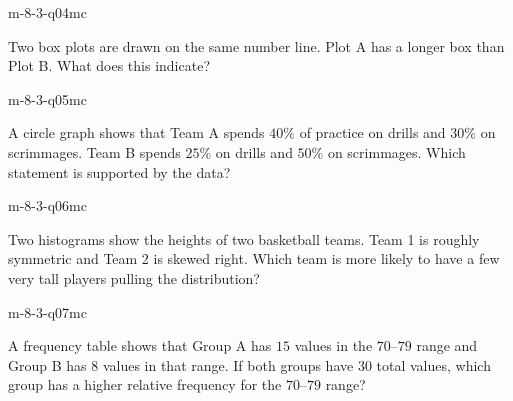 \begin{practiceQuestion}{m-8-3-q04}{mc}
\begin{questionText}
Two box plots are drawn on the same number line. Plot A has a longer box than Plot B. What does this indicate?
\end{questionText}
\end{practiceQuestion}

\begin{practiceQuestion}{m-8-3-q05}{mc}
\begin{questionText}
A circle graph shows that Team A spends $40\%$ of practice on drills and $30\%$ on scrimmages. Team B spends $25\%$ on drills and $50\%$ on scrimmages. Which statement is supported by the data?
\end{questionText}
\end{practiceQuestion}

\begin{practiceQuestion}{m-8-3-q06}{mc}
\begin{questionText}
Two histograms show the heights of two basketball teams. Team 1 is roughly symmetric and Team 2 is skewed right. Which team is more likely to have a few very tall players pulling the distribution?
\end{questionText}
\end{practiceQuestion}

\begin{practiceQuestion}{m-8-3-q07}{mc}
\begin{questionText}
A frequency table shows that Group A has $15$ values in the $70$--$79$ range and Group B has $8$ values in that range. If both groups have $30$ total values, which group has a higher relative frequency for the $70$--$79$ range?
\end{questionText}
\end{practiceQuestion}

